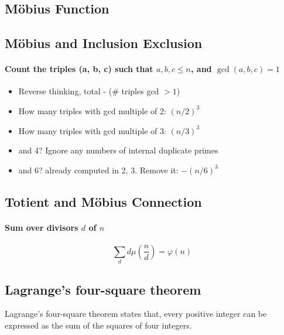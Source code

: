         \subsection{Möbius Function}

        \subsection{Möbius and Inclusion Exclusion}
	        \paragraph{Count the triples (a, b, c) such that \(a, b, c \leq n\), and
	            \(\gcd(a, b, c) = 1\)}
	        \begin{itemize}
	            \item Reverse thinking, total - (\# triples gcd \(> 1\))
	            \item How many triples with gcd multiple of 2: \((n/2)^3\)
	            \item How many triples with gcd multiple of 3: \((n/3)^3\)
	            \item and 4? Ignore any numbers of internal duplicate primes
	            \item and 6? already computed in 2, 3. Remove it:  \(-(n/6)^3\)
	        \end{itemize}


        \subsection{Totient and Möbius Connection}
	        \paragraph{Sum over divisors \(d\) of \(n\)}
	        \[
	        \sum_d d \mu \left( \frac{n}{d} \right) = \varphi(n)
	        \]
        
        \subsection{Lagrange's four-square theorem}
        	Lagrange's four-square theorem states that, every positive integer can be expressed as the sum of the squares of four integers.
